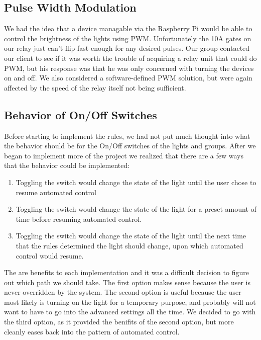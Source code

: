 \documentclass[oneside,openright]{book}
\begin{document}
\subsection{Pulse Width Modulation}

We had the idea that a device managable via the Raspberry Pi would be able to
control the brightness of the lights using PWM. Unfortunately the 10A gates on
our relay just can't flip fast enough for any desired pulses. Our group
contacted our client to see if it was worth the trouble of acquiring a relay
unit that could do PWM, but his response was that he was only concerned with
turning the devices on and off. We also considered a software-defined PWM
solution, but were again affected by the speed of the relay itself not being
sufficient.

\subsection{Behavior of On/Off Switches}

Before starting to implement the rules, we had not put much thought into what
the behavior should be for the On/Off switches of the lights and groups. After
we began to implement more of the project we realized that there are a few ways
that the behavior could be implemented:

\begin{enumerate}
  \item Toggling the switch would change the state of the light until the user
      chose to resume automated control
  \item Toggling the switch would change the state of the light for a preset
      amount of time before resuming automated control.
  \item Toggling the switch would change the state of the light until the next
      time that the rules determined the light should change, upon which
      automated control would resume.
\end{enumerate}

The are benefits to each implementation and it was a difficult decision to
figure out which path we should take. The first option makes sense because the
user is never overridden by the system. The second option is useful because the
user most likely is turning on the light for a temporary purpose, and probably
will not want to have to go into the advanced settings all the time. We decided
to go with the third option, as it provided the benifits of the second option,
but more cleanly eases back into the pattern of automated control.
\end{document}
